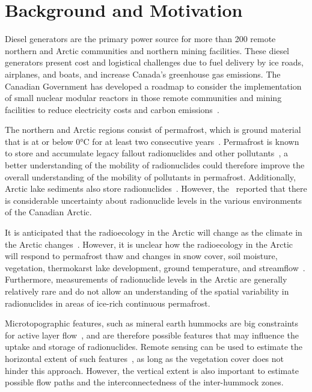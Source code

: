 \chapter{Background and Motivation}
Diesel generators are the primary power source for more than 200 remote northern and Arctic communities and northern mining facilities. 
These diesel generators present cost and logistical challenges due to fuel delivery by ice roads, airplanes, and boats, and increase Canada's greenhouse gas emissions. 
The Canadian Government has developed a roadmap to consider the implementation of small nuclear modular reactors in those remote communities and mining facilities to 
reduce electricity costs and carbon emissions~\citep{canadiansmallmodularreactorroadmapsteeringcommitteeCallActionCanadian2018}.

The northern and Arctic regions consist of permafrost, which is ground material that is at or below 0°C for at least two consecutive years~\citep{lewkowiczIllustratedPermafrostDictionary2024}. 
Permafrost is known to store and accumulate legacy fallout radionuclides and other pollutants~\citep{bondPermafrostThawImplications2018, olsonMercuryCyclingNorthern2018}, 
a better understanding of the mobility of radionuclides could therefore improve the overall understanding of the mobility of pollutants in permafrost. 
Additionally, Arctic lake sediments also store radionuclides~\citep{marshLakeSedimentationMackenzie1999}. 
However, the~\citet{arcticmonitoringandassessmentprogrammeamapAMAPAssessment20152015} reported that there is considerable uncertainty about radionuclide levels in the various environments of the Canadian Arctic.

It is anticipated that the radioecology in the Arctic will change as the climate in the Arctic changes~\citep{arcticmonitoringandassessmentprogrammeamapAMAPAssessment20152015, bondPermafrostThawImplications2018}. 
However, it is unclear how the radioecology in the Arctic will respond to permafrost thaw and changes in snow cover, soil moisture, vegetation, thermokarst lake development, ground temperature, and streamflow~\citep{overlandIntegratedIndexRecent2019}. 
Furthermore, measurements of radionuclide levels in the Arctic are generally relatively rare and do not allow an understanding of the spatial variability in radionuclides in areas of ice-rich continuous permafrost.

Microtopographic features, such as mineral earth hummocks are big constraints for active layer flow~\citep{quintonSubsurfaceDrainageHummockcovered2000}, and are therefore possible features that may influence the uptake and storage of radionuclides. 
Remote sensing can be used to estimate the horizontal extent of such features~\citep{dakinHowDryYear2023}, as long as the vegetation cover does not hinder this approach.
However, the vertical extent is also important to estimate possible flow paths and the interconnectedness of the inter-hummock zones.

